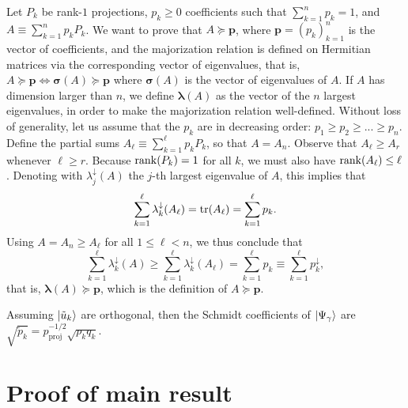 \documentclass[
	aps, pra,
	superscriptaddress, twocolumn,
	floatfix,
	10pt
]{revtex4-1}
\newcommand{\bs}[1]{\boldsymbol{#1}}
\newcommand{\on}[1]{\operatorname{#1}}
\newcommand{\parTitle}[1]{\noindent{\color{Mahogany}(\emph{#1})}}
\renewcommand{\parTitle}[1]{}
\begin{document}
Let $P_k$ be rank-$1$ projections, $p_k\ge0$ coefficients such that $\sum_{k=1}^n p_k=1$, and
$A\equiv \sum_{k=1}^n p_k P_k$. We want to prove that $A\succeq \bs p$,
where $\bs p=(p_k)_{k=1}^n$ is the vector of coefficients, and the majorization relation is defined on Hermitian matrices via the corresponding vector of eigenvalues, that is,
$A\succeq\bs p\Longleftrightarrow \bs\sigma(A)\succeq\bs p$ where $\bs\sigma(A)$ is the vector of eigenvalues of $A$. If $A$ has dimension larger than $n$, we define $\bs\lambda(A)$ as the vector of the $n$ largest eigenvalues, in order to make the majorization relation well-defined.
Without loss of generality, let us assume that the $p_k$ are in decreasing order: $p_1 \ge p_2 \ge ...\ge p_n$.
Define the partial sums $A_\ell\equiv \sum_{k=1}^\ell p_k P_k$, so that $A=A_n$.
Observe that $A_\ell \ge A_r$ whenever $\ell\ge r$.
Because $\rank(P_k)=1$ for all $k$, we must also have $\rank(A_\ell)\le \ell$.
Denoting with $\lambda_j^\downarrow(A)$ the $j$-th largest eigenvalue of $A$, this implies that
\begin{equation}
    \sum_{k=1}^\ell \lambda_k^\downarrow(A_\ell) = \tr(A_\ell)
    = \sum_{k=1}^\ell p_k.
\end{equation}
Using $A=A_n\ge A_\ell$ for all $1\le \ell< n$, we thus conclude that
\begin{equation}
    \sum_{k=1}^\ell \lambda_k^\downarrow(A) \ge 
    \sum_{k=1}^\ell \lambda_k^\downarrow(A_\ell)
    = \sum_{k=1}^\ell p_k \equiv \sum_{k=1}^\ell p_k^\downarrow,
\end{equation}
that is, $\bs\lambda(A)\succeq \bs p$, which is the definition of $A\succeq \bs p$.

\parTitle{Entanglement degradation for different probabilities}
Assuming $\ket{\tilde u_k}$ are orthogonal, then the Schmidt coefficients of $\ket{\Psi_\gamma}$ are $\sqrt{\tilde p_k}=p^{-1/2}_{\on{proj}}\sqrt{p_k q_k}$.



\section{Proof of main result}
\label{appB}
\end{document}
